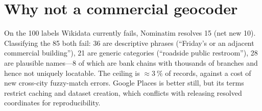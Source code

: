 \documentclass[10pt,a4paper]{article}
\begin{document}
\section{Why not a commercial geocoder}
\label{app:geocoder}

On the \num{100} labels Wikidata
currently fails, Nominatim resolves \num{15} (net new \num{10}). Classifying the
\num{85} both fail: \num{36} are descriptive phrases (``Friday's or an adjacent
commercial building''), \num{21} are generic categories (``roadside public
restroom''), \num{28} are plausible names---\num{8} of which are bank chains with
thousands of branches and hence not uniquely locatable. The ceiling is
$\approx\SI{3}{\percent}$ of records, against a cost of new cross-city
fuzzy-match errors. Google Places is better still, but its terms restrict
caching and dataset creation, which conflicts with releasing resolved
coordinates for reproducibility.
\end{document}

